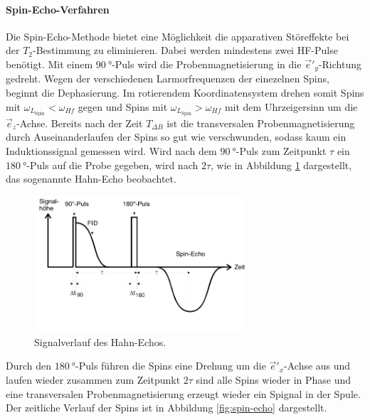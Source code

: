 \paragraph{Spin-Echo-Verfahren}
Die Spin-Echo-Methode bietet eine Möglichkeit die apparativen Störeffekte
bei der $T_2$-Bestimmung zu eliminieren.
Dabei werden mindestens zwei HF-Pulse benötigt.
Mit einem $\SI{90}{\degree}$-Puls wird die Probenmagnetisierung in die
$\vec{e}'_y$-Richtung gedreht.
Wegen der verschiedenen Larmorfrequenzen der einezelnen Spins, beginnt die Dephasierung.
Im rotierendem Koordinatensystem drehen somit Spins mit $\omega_{L_\text{Spin}}<\omega_{Hf}$
gegen und Spins mit $\omega_{L_\text{Spin}}>\omega_{Hf}$ mit dem
Uhrzeigersinn um die $\vec{e}_z$-Achse.
Bereits nach der Zeit $T_{\Delta B}$ ist die transversalen
Probenmagnetisierung durch
Auseinanderlaufen der Spins so gut wie verschwunden,
sodass kaum ein Induktionssignal
gemessen wird. Wird nach dem $\SI{90}{\degree}$-Puls
zum Zeitpunkt $\tau$
ein $\SI{180}{\degree}$-Puls
auf die Probe gegeben, wird nach $2\tau$,
wie in Abbildung \ref{fig:hahn-echo} dargestellt,
das sogenannte Hahn-Echo beobachtet.
\begin{figure}
  \centering
  \includegraphics[width=0.7\textwidth]{hahn-echo.PNG}
  \caption{Signalverlauf des Hahn-Echos.\cite{sample}}
  \label{fig:hahn-echo}
\end{figure}
Durch den $\SI{180}{\degree}$-Puls führen
die Spins eine Drehung um die
$\vec{e}'_x$-Achse aus und laufen wieder zusammen
zum Zeitpunkt $2\tau$ sind alle Spins wieder in Phase und eine
transversalen Probenmagnetisierung
erzeugt wieder ein Spignal in der Spule.
Der zeitliche Verlauf der Spins ist in Abbildung
\ref{fig:spin-echo} dargestellt.
\FloatBarrier
